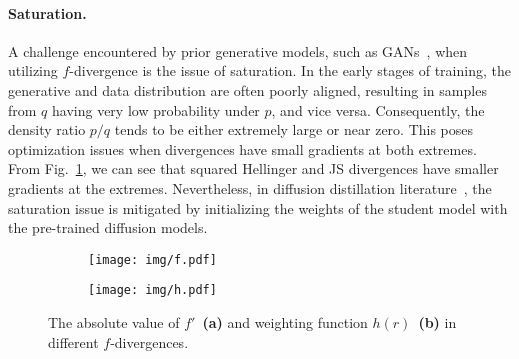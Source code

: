 \vspace{-10pt}

\paragraph{Saturation.} A challenge encountered by prior generative models, such as GANs~\cite{goodfellow2014generative}, when utilizing $f$-divergence is the issue of saturation.  In the early stages of training, the generative and data distribution are often poorly aligned, resulting in samples from $q$ having very low probability under $p$, and vice versa. Consequently, the density ratio $p/q$ tends to be either extremely large or near zero. This poses optimization issues when divergences have small gradients at both extremes. From Fig.~\ref{fig:f}, we can see that squared Hellinger and JS divergences have smaller gradients at the extremes. Nevertheless, in diffusion distillation literature~\cite{yin2024one, yin2024improved}, the saturation issue is mitigated by initializing the weights of the student model with the pre-trained diffusion models.

\begin{figure}[t]
    \centering
    \vspace{-0.6cm}
  \begin{subfigure}[b]{0.234\textwidth}
    \texttt{[image: img/f.pdf]}
        \vspace{-9pt}
    \caption{}
        \label{fig:f}
  \end{subfigure}
 \hfill
  \begin{subfigure}[b]{0.234\textwidth}
    \texttt{[image: img/h.pdf]}
    \vspace{-9pt}
    \caption{}
        \label{fig:h}
  \end{subfigure}
  \vspace{-6pt}
    \caption{The absolute value of $f'$~\textbf{(a)} and weighting function $h(r)$~\textbf{(b)} in different $f$-divergences.}
    \vspace{-15pt}
\end{figure}

